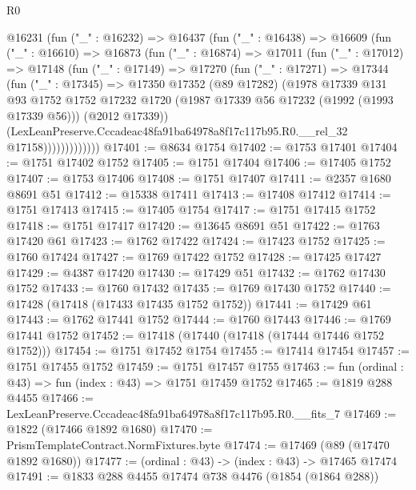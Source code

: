 \begin{lexlean}{R0}
\begin{coremodule}
          @16231
            (fun ("_" : @16232) =>
            @16437
              (fun ("_" : @16438) =>
              @16609
                (fun ("_" : @16610) =>
                @16873
                  (fun ("_" : @16874) =>
                  @17011
                    (fun ("_" : @17012) =>
                    @17148
                      (fun ("_" : @17149) =>
                      @17270
                        (fun ("_" : @17271) =>
                        @17344
                          (fun ("_" : @17345) =>
                          @17350
                            @17352
                            (@89 @17282)
                            (@1978
                              @17339
                              @131
                              @93
                              @1752
                              @1752
                              @17232
                              @1720
                              (@1987 @17339 @56 @17232 (@1992 (@1993 @17339 @56)))
                              (@2012 @17339))
                            (LexLeanPreserve.Cccadeac48fa91ba64978a8f17c117b95.R0.__rel_32
                              @17158)))))))))))))
@17401 := @8634 @1754
@17402 := @1753 @17401
@17404 := @1751 @17402 @1752
@17405 := @1751 @17404
@17406 := @17405 @1752
@17407 := @1753 @17406
@17408 := @1751 @17407
@17411 := @2357 @1680 @8691 @51
@17412 := @15338 @17411
@17413 := @17408 @17412
@17414 := @1751 @17413
@17415 := @17405 @1754
@17417 := @1751 @17415 @1752
@17418 := @1751 @17417
@17420 := @13645 @8691 @51
@17422 := @1763 @17420 @61
@17423 := @1762 @17422
@17424 := @17423 @1752
@17425 := @1760 @17424
@17427 := @1769 @17422 @1752
@17428 := @17425 @17427
@17429 := @4387 @17420
@17430 := @17429 @51
@17432 := @1762 @17430 @1752
@17433 := @1760 @17432
@17435 := @1769 @17430 @1752
@17440 := @17428 (@17418 (@17433 @17435 @1752 @1752))
@17441 := @17429 @61
@17443 := @1762 @17441 @1752
@17444 := @1760 @17443
@17446 := @1769 @17441 @1752
@17452 := @17418 (@17440 (@17418 (@17444 @17446 @1752 @1752)))
@17454 := @1751 @17452 @1754
@17455 := @17414 @17454
@17457 := @1751 @17455 @1752
@17459 := @1751 @17457 @1755
@17463 := fun (ordinal : @43) => fun (index : @43) => @1751 @17459 @1752
@17465 := @1819 @288 @4455
@17466 := LexLeanPreserve.Cccadeac48fa91ba64978a8f17c117b95.R0.__fits_7
@17469 := @1822 (@17466 @1892 @1680)
@17470 := PrismTemplateContract.NormFixtures.byte
@17474 := @17469 (@89 (@17470 @1892 @1680))
@17477 := (ordinal : @43) -> (index : @43) -> @17465 @17474
@17491 := @1833
    @288
    @4455
    @17474
    @738
    @4476
    (@1854 (@1864 @288))

\end{coremodule}
\end{lexlean}
